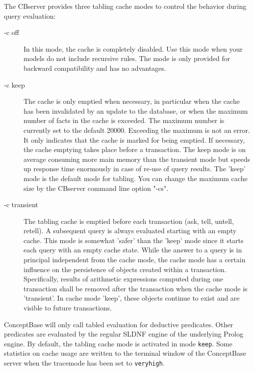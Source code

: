 The CBserver provides three tabling cache modes to control the
behavior during query evaluation:

\begin{description}

\item[-c off] In this mode, the cache is completely disabled. Use this mode
when your models do not include recursive rules.
The mode is only provided for backward compatibility and has no advantages.

\item[-c keep] The cache is only emptied when necessary, in particular when the cache
has been invalidated by an update to the database, or when the maximum number
of facts in the cache is exceeded. The maximum number is currently set
to the default 20000. Exceeding the maximum is not an error. It only indicates that the cache
is marked for being emptied. If necessary, the cache emptying takes place before
a transaction. The keep mode is on average consuming more main memory than the
transient mode but speeds up response time enormously in case of re-use of query
results. The 'keep' mode is the default mode for tabling. You can change the maximum
cache size by the CBserver command line option "-cs".

\item[-c transient] The tabling cache is emptied before
each transaction (ask, tell, untell, retell). A subsequent query is always
evaluated starting with an empty cache. This mode is somewhat 'safer' than the
'keep' mode since it starts each query with an empty cache state. 
While the answer to a query is in principal independent from the cache mode,
the cache mode has a certain influence on the persistence of objects created
within a transaction. Specifically, results of arithmetic expressions 
computed during one transaction shall be removed after the transaction
when the cache mode is 'transient'. In cache mode 'keep', these objects
continue to exist and are visible to future transactions. 

\end{description}

ConceptBase will only call tabled evaluation for deductive predicates.
Other predicates are evaluated by the regular SLDNF engine of the
underlying Prolog engine.
By default, the tabling cache mode is activated in mode {\tt keep}.
Some statistics on cache usage are written to the terminal window of
the ConceptBase server when the tracemode has been set to {\tt veryhigh}. 

